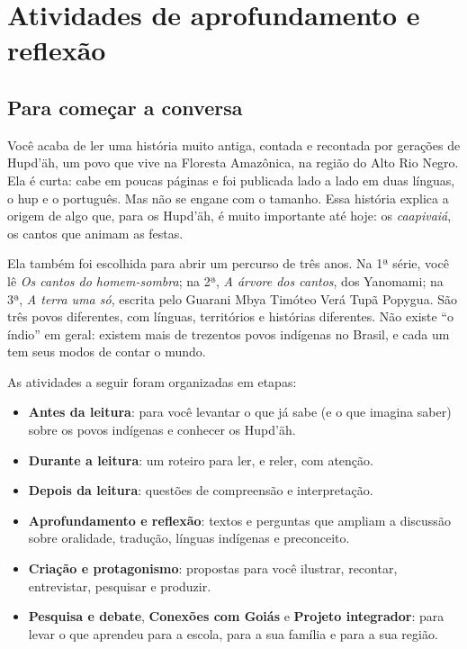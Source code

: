 
\blankAtodd
\part{Atividades de aprofundamento e reflexão}

\chapter{Para começar a conversa}

Você acaba de ler uma história muito antiga, contada e recontada por
gerações de Hupd'äh, um povo que vive na Floresta Amazônica, na região
do Alto Rio Negro. Ela é curta: cabe em poucas páginas e foi publicada
lado a lado em duas línguas, o hup e o português. Mas não se engane com
o tamanho. Essa história explica a origem de algo que, para os Hupd'äh,
é muito importante até hoje: os \textit{caapivaiá}, os cantos que
animam as festas.

Ela também foi escolhida para abrir um percurso de três anos. Na
1ª série, você lê \textit{Os cantos do homem-sombra}; na 2ª,
\textit{A árvore dos cantos}, dos Yanomami; na 3ª, \textit{A terra uma
só}, escrita pelo Guarani Mbya Timóteo Verá Tupã Popygua. São três
povos diferentes, com línguas, territórios e histórias diferentes. Não
existe ``o índio'' em geral: existem mais de trezentos povos indígenas
no Brasil, e cada um tem seus modos de contar o mundo.

As atividades a seguir foram organizadas em etapas:

\begin{itemize}
\item \textbf{Antes da leitura}: para você levantar o que já
sabe (e o que imagina saber) sobre os povos indígenas e conhecer os
Hupd'äh.
\item \textbf{Durante a leitura}: um roteiro para ler, e
reler, com atenção.
\item \textbf{Depois da leitura}: questões de compreensão e
interpretação.
\item \textbf{Aprofundamento e reflexão}: textos e perguntas
que ampliam a discussão sobre oralidade, tradução, línguas indígenas e
preconceito.
\item \textbf{Criação e protagonismo}: propostas para você
ilustrar, recontar, entrevistar, pesquisar e produzir.
\item \textbf{Pesquisa e debate}, \textbf{Conexões
com Goiás} e \textbf{Projeto integrador}: para levar o que
aprendeu para a escola, para a sua família e para a sua região.
\end{itemize}

